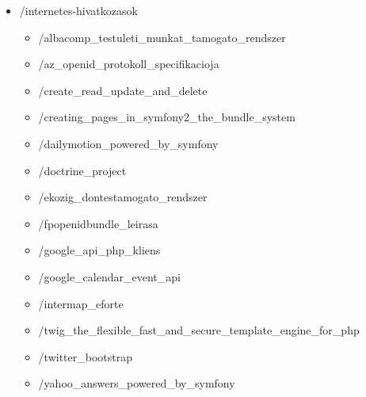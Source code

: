 \documentclass[a4paper,12pt,oneside]{report}
\begin{document}
\begin{itemize}
    \item[] /internetes-hivatkozasok
    \begin{itemize}
        \item[] /albacomp\_testuleti\_munkat\_tamogato\_rendszer
        \item[] /az\_openid\_protokoll\_specifikacioja
        \item[] /create\_read\_update\_and\_delete
        \item[] /creating\_pages\_in\_symfony2\_the\_bundle\_system
        \item[] /dailymotion\_powered\_by\_symfony
        \item[] /doctrine\_project
        \item[] /ekozig\_dontestamogato\_rendszer
        \item[] /fpopenidbundle\_leirasa
        \item[] /google\_api\_php\_kliens
        \item[] /google\_calendar\_event\_api
        \item[] /intermap\_eforte
        \item[] /twig\_the\_flexible\_fast\_and\_secure\_template\_engine\_for\_php
        \item[] /twitter\_bootstrap
        \item[] /yahoo\_answers\_powered\_by\_symfony
    \end{itemize}
\end{itemize}
\end{document}
